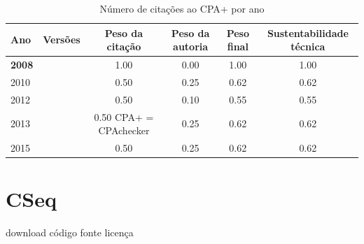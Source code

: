 \begin{table}[H]
\caption{Número de citações ao CPA+  por ano}
\centering
\begin{tabular}{| l | c | c | c | c | c |}
  \hline
  Ano & Versões & Peso da citação & Peso da autoria & Peso final & Sustentabilidade técnica \\
  \hline
            {\bf 2008}
          &
          
          &
          1.00
          &
          0.00
          &
          1.00
          &
            {\color{blue} 1.00}
          \\
\hline
            2010
          &
          
          &
          0.50
          &
          0.25
          &
          0.62
          &
            {\color{blue} 0.62}
          \\
\hline
            2012
          &
          
          &
          0.50
          &
          0.10
          &
          0.55
          &
            {\color{blue} 0.55}
          \\
\hline
            2013
          &
          
          &
          0.50
            {\tiny CPA+ = CPAchecker}
          &
          0.25
          &
          0.62
          &
            {\color{blue} 0.62}
          \\
\hline
            2015
          &
          
          &
          0.50
          &
          0.25
          &
          0.62
          &
            {\color{blue} 0.62}
          \\
\hline
\end{tabular}
\end{table}



\section{CSeq}
\checkmark download
\checkmark código fonte
\checkmark licença


